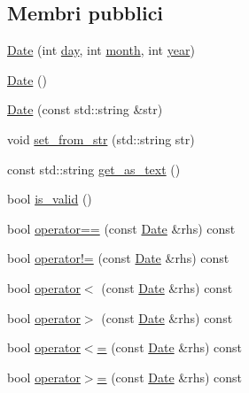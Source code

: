 \subsection*{Membri pubblici}
\begin{DoxyCompactItemize}
\item 
\mbox{\hyperlink{structmm_1_1util_1_1_date_afe2513fbf246f7f3e61e7d1a06d0e6d0}{Date}} (int \mbox{\hyperlink{structmm_1_1util_1_1_date_a6a697c80be4f09cdb4ee400721314d87}{day}}, int \mbox{\hyperlink{structmm_1_1util_1_1_date_a018f3e7261b88c9a47aae5b08120b331}{month}}, int \mbox{\hyperlink{structmm_1_1util_1_1_date_a318909ff98468f29c7912fa9cffea079}{year}})
\item 
\mbox{\hyperlink{structmm_1_1util_1_1_date_a9aaf2c2d5171e081541831c4a756232e}{Date}} ()
\item 
\mbox{\hyperlink{structmm_1_1util_1_1_date_a9065cbdea26e95cfbb6537a5ba06f45d}{Date}} (const std\+::string \&str)
\item 
void \mbox{\hyperlink{structmm_1_1util_1_1_date_a9140b9c53f02f7385af15684c81c5ed0}{set\+\_\+from\+\_\+str}} (std\+::string str)
\item 
const std\+::string \mbox{\hyperlink{structmm_1_1util_1_1_date_aa32e7e2771581a860a49a59cdbcec8f8}{get\+\_\+as\+\_\+text}} ()
\item 
bool \mbox{\hyperlink{structmm_1_1util_1_1_date_ae4b2c74f7e6ebfed3daaafc999af31ba}{is\+\_\+valid}} ()
\item 
bool \mbox{\hyperlink{structmm_1_1util_1_1_date_a55071cbbf31cd8956cd4a7d5116e0d95}{operator==}} (const \mbox{\hyperlink{structmm_1_1util_1_1_date}{Date}} \&rhs) const
\item 
bool \mbox{\hyperlink{structmm_1_1util_1_1_date_a9f2556bcc1150f5542d59b2f9078ee1b}{operator!=}} (const \mbox{\hyperlink{structmm_1_1util_1_1_date}{Date}} \&rhs) const
\item 
bool \mbox{\hyperlink{structmm_1_1util_1_1_date_acb395628bc3074f0f5f782e39f7ecbbf}{operator$<$}} (const \mbox{\hyperlink{structmm_1_1util_1_1_date}{Date}} \&rhs) const
\item 
bool \mbox{\hyperlink{structmm_1_1util_1_1_date_a5b070fd2cd4a72cf74849abd9244b6d3}{operator$>$}} (const \mbox{\hyperlink{structmm_1_1util_1_1_date}{Date}} \&rhs) const
\item 
bool \mbox{\hyperlink{structmm_1_1util_1_1_date_aec9077b20de935d88cc03e4c454915a3}{operator$<$=}} (const \mbox{\hyperlink{structmm_1_1util_1_1_date}{Date}} \&rhs) const
\item 
bool \mbox{\hyperlink{structmm_1_1util_1_1_date_ab0dc9872f7646c748d492afcff696a0d}{operator$>$=}} (const \mbox{\hyperlink{structmm_1_1util_1_1_date}{Date}} \&rhs) const

\end{DoxyCompactItemize}
